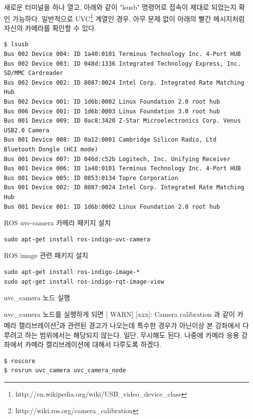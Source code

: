 \noindent
새로운 터미널을 하나 열고, 아래와 같이 "lsusb" 명령어로 접속이 제대로 되었는지 확인 가능하다. 일반적으로 UVC\footnote{http://en.wikipedia.org/wiki/USB\_video\_device\_class} 계열인 경우, 아무 문제 없이 아래의 빨간 메시지처럼 자신의 카메라를 확인할 수 있다. 

\begin{lstlisting}[language=ROS]
$ lsusb
Bus 002 Device 004: ID 1a40:0101 Terminus Technology Inc. 4-Port HUB
Bus 002 Device 003: ID 048d:1336 Integrated Technology Express, Inc. SD/MMC Cardreader
Bus 002 Device 002: ID 8087:0024 Intel Corp. Integrated Rate Matching Hub
Bus 002 Device 001: ID 1d6b:0002 Linux Foundation 2.0 root hub
Bus 006 Device 001: ID 1d6b:0003 Linux Foundation 3.0 root hub
Bus 001 Device 009: ID 0ac8:3420 Z-Star Microelectronics Corp. Venus USB2.0 Camera
Bus 001 Device 008: ID 0a12:0001 Cambridge Silicon Radio, Ltd Bluetooth Dongle (HCI mode)
Bus 001 Device 007: ID 046d:c52b Logitech, Inc. Unifying Receiver
Bus 001 Device 006: ID 1a40:0101 Terminus Technology Inc. 4-Port HUB
Bus 001 Device 005: ID 0853:0134 Topre Corporation 
Bus 001 Device 002: ID 8087:0024 Intel Corp. Integrated Rate Matching Hub
Bus 001 Device 001: ID 1d6b:0002 Linux Foundation 2.0 root hub
\end{lstlisting}

\noindent
{}\circled{\thenum} ROS uvc-camera 카메라 패키지 설치

\begin{lstlisting}[language=ROS]
sudo apt-get install ros-indigo-uvc-camera
\end{lstlisting}

\noindent
{}\circled{\thenum} ROS image 관련 패키지 설치

\begin{lstlisting}[language=ROS]
sudo apt-get install ros-indigo-image-*
sudo apt-get install ros-indigo-rqt-image-view 
\end{lstlisting}

\noindent
{}\circled{\thenum} uvc\_camera 노드 실행

\noindent
uvc\_camera 노드를 실행하게 되면 [ WARN] [xxx]: Camera calibration 과 같이 카메라 캘리브레이션\footnote{http://wiki.ros.org/camera\_calibration}과 관련된 경고가 나오는데 특수한 경우가 아닌이상 본 강좌에서 다루려고 하는 범위에서는 해당되지 않는다. 일단, 무시해도 된다. 나중에 카메라 응용 강좌에서 카메라 캘리브레이션에 대해서 다루도록 하겠다.

\begin{lstlisting}[language=ROS]
$ roscore
$ rosrun uvc_camera uvc_camera_node
\end{lstlisting}

